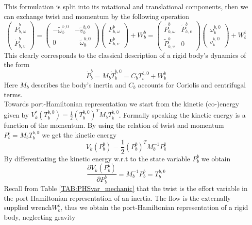 \documentclass[a4paper,twoside, openright,12pt]{report}
\begin{document}
This formulation is split into its rotational and translational components, then we can exchange twist and momentum by the following operation
\begin{equation}
\begin{pmatrix}
\dot{P}_{b,\omega}^b \\ \dot{P}_{b,v}^b \end{pmatrix} = \begin{pmatrix}
-\tilde{\omega}_b^{b,0} & -\tilde{v}_b^{b,0} \\ 0 & -\tilde{\omega}_b^{b,0}\end{pmatrix} \begin{pmatrix}
P_{b,\omega}^b \\ P_{b,v}^b 
\end{pmatrix} + W_b^b = \begin{pmatrix}
\tilde{P}_{b,\omega}^b & \tilde{P}_{b,v}^b \\ \tilde{P}_{b,v}^b & 0
\end{pmatrix} \begin{pmatrix}
\omega_b^{b,0} \\ v_b^{b,0}
\end{pmatrix} +W_b^b
\end{equation}
This clearly corresponds to the classical description of a rigid body's dynamics of the form
\begin{equation}
	\dot{P}_b^b = M_b \dot{T}_b^{b,0}  = C_b T_b^{b,0} + W_{b}^b
\end{equation}
Here $M_b$ describes the body's inertia and $C_b$ accounts for Coriolis and centrifugal terms.\\
Towards port-Hamiltonian representation we start from the kinetic (co-)energy given by $V_k^*(T_b^{b,0}) =\frac{1}{2}(T_b^{b,0})^T M_b T_b^{b,0}$. Formally speaking the kinetic energy is a function of the momentum. By using the relation of twist and momentum $P_b^b = M_b T_b^{b,0}$ we get the kinetic energy
\begin{equation}
V_k(P_b^b) = \frac{1}{2}(P_b^b)^T M_b^{-1} P_b^b
\end{equation}
By differentiating the kinetic energy w.r.t to the state variable $P_b^b$ we obtain 
\begin{equation}
\frac{\partial V_k(P_b^b)}{\partial P_b^b} = M_b^{-1} P_b^b = T_b^{b,0}
\end{equation}
Recall from Table \ref{TAB:PHSvar_mechanic} that the twist is the effort variable in the port-Hamiltonian representation of an inertia. The flow is the externally supplied wrench$W_b^b$, thus we obtain the port-Hamiltonian representation of a rigid body, neglecting gravity
\end{document}
